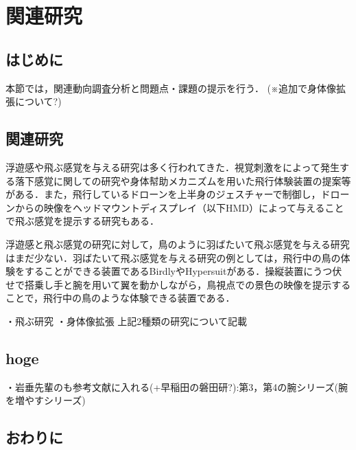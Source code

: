\chapter[関連研究]%
        {関連研究}


\section{はじめに}
        本節では，関連動向調査分析と問題点・課題の提示を行う．
        (※追加で身体像拡張について?)

\section{関連研究}
        浮遊感や飛ぶ感覚を与える研究は多く行われてきた．視覚刺激をによって発生する落下感覚に関しての研究\cite{奥川夏輝2017VR空間における視覚刺激によって発生する落下感覚の分析}や身体幇助メカニズムを用いた飛行体験装置の提案\cite{鈴木拓馬2014hmd}等がある．また，飛行しているドローンを上半身のジェスチャーで制御し，ドローンからの映像をヘッドマウントディスプレイ（以下HMD）によって与えることで飛ぶ感覚を提示する研究\cite{rognon2018flyjacket}もある．

        浮遊感と飛ぶ感覚の研究に対して，鳥のように羽ばたいて飛ぶ感覚を与える研究はまだ少ない．羽ばたいて飛ぶ感覚を与える研究の例としては，飛行中の鳥の体験をすることができる装置であるBirdly\cite{rheiner2014birdly}やHypersuit\cite{hypersuit}がある．操縦装置にうつ伏せで搭乗し手と腕を用いて翼を動かしながら，鳥視点での景色の映像を提示することで，飛行中の鳥のような体験できる装置である．


        ・飛ぶ研究
        ・身体像拡張
        上記2種類の研究について記載


\section{hoge}        
        ・岩垂先輩のも参考文献に入れる(+早稲田の磐田研?):第3，第4の腕シリーズ(腕を増やすシリーズ) 

\section{おわりに}